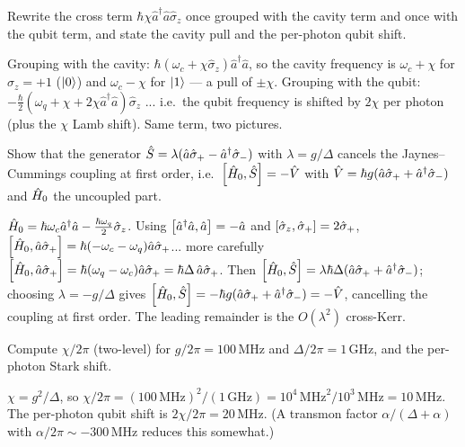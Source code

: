 \begin{exercise}
Rewrite the cross term $\hbar\chi\hat a^\dagger\hat a\hat\sigma_z$
once grouped with the cavity term and once with the qubit term, and
state the cavity pull and the per-photon qubit shift.
\begin{solution}
Grouping with the cavity:
$\hbar(\omega_c+\chi\hat\sigma_z)\hat a^\dagger\hat a$, so the cavity
frequency is $\omega_c+\chi$ for $\hat\sigma_z=+1$ ($\ket0$) and
$\omega_c-\chi$ for $\ket1$ --- a pull of $\pm\chi$. Grouping with
the qubit: $-\tfrac\hbar2(\omega_q+\chi+2\chi\hat a^\dagger\hat a)\hat\sigma_z$
... i.e.\ the qubit frequency is shifted by $2\chi$ per photon
(plus the $\chi$ Lamb shift). Same term, two pictures.
\end{solution}
\end{exercise}

\begin{exercise}
Show that the generator $\hat{S}=\lambda(\hat a\hat\sigma_+-\hat a^\dagger\hat\sigma_-)$
with $\lambda=g/\Delta$ cancels the Jaynes--Cummings coupling at
first order, i.e.\ $\comm{\op H_0}{\op S}=-\op V$ with
$\hat{V}=\hbar g(\hat a\hat\sigma_++\hat a^\dagger\hat\sigma_-)$ and
$\hat{H}_0$ the uncoupled part.
\begin{solution}
$\hat{H}_0=\hbar\omega_c\hat a^\dagger\hat a-\tfrac{\hbar\omega_q}2\hat\sigma_z$.
Using $\comm{\hat a^\dagger\hat a}{\hat a}=-\hat a$ and
$\comm{\hat\sigma_z}{\hat\sigma_+}=2\hat\sigma_+$,
$\comm{\op H_0}{\hat a\hat\sigma_+}=\hbar(-\omega_c-\omega_q)\hat a\hat\sigma_+$...
more carefully $\comm{\op H_0}{\hat a\hat\sigma_+}=\hbar(\omega_q-\omega_c)\hat a\hat\sigma_+=\hbar\Delta\,\hat a\hat\sigma_+$.
Then $\comm{\op H_0}{\op S}=\lambda\hbar\Delta(\hat a\hat\sigma_++\hat a^\dagger\hat\sigma_-)$;
choosing $\lambda=-g/\Delta$ gives $\comm{\op H_0}{\op S}=-\hbar g(\hat a\hat\sigma_++\hat a^\dagger\hat\sigma_-)=-\op V$,
cancelling the coupling at first order. The leading remainder is the
$O(\lambda^2)$ cross-Kerr.
\end{solution}
\end{exercise}

\begin{exercise}
Compute $\chi/2\pi$ (two-level) for $g/2\pi=100\,$MHz and
$\Delta/2\pi=1\,$GHz, and the per-photon Stark shift.
\begin{solution}
$\chi=g^2/\Delta$, so $\chi/2\pi=(100\,\text{MHz})^2/(1\,\text{GHz})
=10^4\,\text{MHz}^2/10^3\,\text{MHz}=10\,$MHz. The per-photon qubit
shift is $2\chi/2\pi=20\,$MHz. (A transmon factor
$\alpha/(\Delta+\alpha)$ with $\alpha/2\pi\sim-300\,$MHz reduces
this somewhat.)
\end{solution}
\end{exercise}


